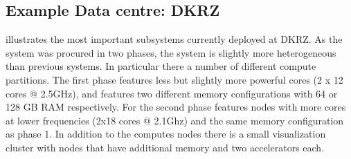 \documentclass{../../template/esiwace-report}
\begin{document}
%
%
%
%
%
%
%
%
%
%




\subsection{Example Data centre: DKRZ}
\label{sec:DKRZ current}



 illustrates the most important subsystems currently deployed at DKRZ.
As the system was procured in two phases, the system is slightly more heterogeneous than previous systems. In particular there a number of different compute partitions.
The first phase features less but slightly more powerful cores (2 x 12 cores @ 2.5GHz), and features two different memory configurations with 64 or 128 GB RAM respectively.
For the second phase features nodes with more cores at lower frequencies (2x18 cores @ 2.1Ghz) and the same memory configuration as phase 1.
In addition to the computes nodes there is a small visualization cluster with nodes that have additional memory and two accelerators each.
\end{document}
